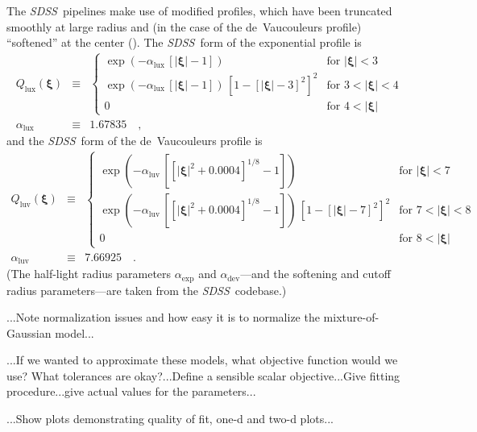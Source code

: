 \documentclass[12pt,pdftex,preprint]{aastex}
\newcommand{\project}[1]{\textsl{#1}}
\newcommand{\sdss}{\project{SDSS}}
\newcommand{\tvector}[1]{\boldsymbol{#1}}
\newcommand{\spos}{\tvector{\xi}}
\newcommand{\dev}{\mathrm{dev}}
\newcommand{\lux}{\mathrm{lux}}
\newcommand{\luv}{\mathrm{luv}}
\begin{document}
The \sdss\ pipelines make use of modified profiles, which have been
truncated smoothly at large radius and (in the case of the
de~Vaucouleurs profile) ``softened'' at the center (\citealt{lupton}).
The \sdss\ form of the exponential profile is
\begin{eqnarray}\displaystyle
Q_{\lux}(\spos) &\equiv& \left\{\begin{array}{ll}
  \exp(-\alpha_{\lux}\,[|\spos| - 1]) & \mbox{for~}|\spos| < 3 \\
  \exp(-\alpha_{\lux}\,[|\spos| - 1])
  \,\left[1 - [|\spos| - 3]^2\right]^2 & \mbox{for~}3 < |\spos| < 4 \\
  0                                   & \mbox{for~}4 < |\spos|
\end{array}\right.
\\
\alpha_{\lux} &\equiv& 1.67835
\quad ,
\end{eqnarray}
and the \sdss\ form of the de~Vaucouleurs profile is
\begin{eqnarray}\displaystyle
Q_{\luv}(\spos) &\equiv& \left\{\begin{array}{ll}
  \exp(-\alpha_{\luv}\,\left[[|\spos|^2 + 0.0004]^{1/8} - 1\right]) & \mbox{for~}|\spos| < 7 \\
  \exp(-\alpha_{\luv}\,\left[[|\spos|^2 + 0.0004]^{1/8} - 1\right])
  \,\left[1 - [|\spos| - 7]^2\right]^2 & \mbox{for~}7 < |\spos| < 8 \\
  0                                   & \mbox{for~}8 < |\spos|
\end{array}\right.
\\
\alpha_{\luv} &\equiv& 7.66925
\quad .
\end{eqnarray}
(The half-light radius parameters $\alpha_{\exp}$ and
$\alpha_{\dev}$---and the softening and cutoff radius parameters---are
taken from the \sdss\ codebase.)

...Note normalization issues and how easy it is to normalize the mixture-of-Gaussian model...

...If we wanted to approximate these models, what objective function
would we use?  What tolerances are okay?...Define a sensible scalar
objective...Give fitting procedure...give actual values for the
parameters...

...Show plots demonstrating quality of fit, one-d and two-d plots...
\end{document}
